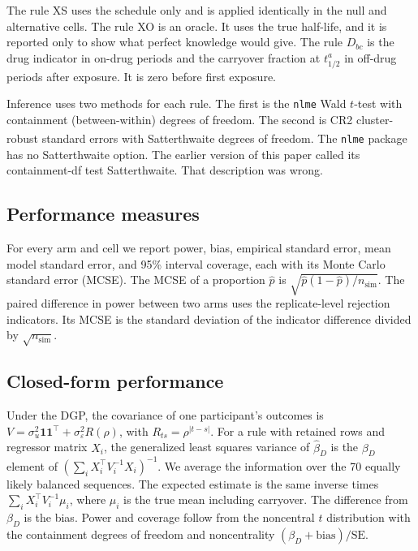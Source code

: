 \documentclass[
  11pt,
]{article}
\begin{document}
The rule XS uses the schedule only and is applied identically in the null and alternative cells. The rule XO is an oracle. It uses the true half-life, and it is reported only to show what perfect knowledge would give. The rule \(D_{bc}\) is the drug indicator in on-drug periods and the carryover fraction at \(t_{1/2}^a\) in off-drug periods after exposure. It is zero before first exposure.

Inference uses two methods for each rule. The first is the \texttt{nlme} Wald \(t\)-test with containment (between-within) degrees of freedom. The second is CR2 cluster-robust standard errors with Satterthwaite degrees of freedom\textsuperscript{}. The \texttt{nlme} package has no Satterthwaite option. The earlier version of this paper called its containment-df test Satterthwaite. That description was wrong.

\subsection{Performance measures}\label{performance-measures}

For every arm and cell we report power, bias, empirical standard error, mean model standard error, and 95\% interval coverage, each with its Monte Carlo standard error (MCSE). The MCSE of a proportion \(\hat p\) is \(\sqrt{\hat p(1-\hat p)/n_{\mathrm{sim}}}\). The paired difference in power between two arms uses the replicate-level rejection indicators. Its MCSE is the standard deviation of the indicator difference divided by \(\sqrt{n_{\mathrm{sim}}}\).

\subsection{Closed-form performance}\label{closed-form-performance}

Under the DGP, the covariance of one participant's outcomes is \(V = \sigma_u^2 \mathbf 1\mathbf 1^\top + \sigma_\varepsilon^2 R(\rho)\), with \(R_{ts} = \rho^{|t-s|}\). For a rule with retained rows and regressor matrix \(X_i\), the generalized least squares variance of \(\hat\beta_D\) is the \(\beta_D\) element of \((\sum_i X_i^\top V_i^{-1} X_i)^{-1}\). We average the information over the 70 equally likely balanced sequences. The expected estimate is the same inverse times \(\sum_i X_i^\top V_i^{-1}\mu_i\), where \(\mu_i\) is the true mean including carryover. The difference from \(\beta_D\) is the bias. Power and coverage follow from the noncentral \(t\) distribution with the containment degrees of freedom and noncentrality \((\beta_D + \mathrm{bias})/\mathrm{SE}\).
\end{document}
